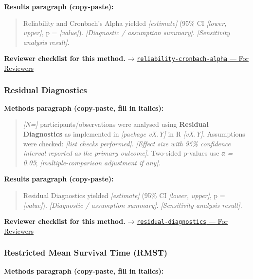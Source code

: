 \documentclass[
]{article}
\begin{document}
\textbf{Results paragraph (copy-paste):}

\begin{quote}
Reliability and Cronbach's Alpha yielded \emph{{[}estimate{]}} (95\% CI
\emph{{[}lower, upper{]}}, p = \emph{{[}value{]}}). \emph{{[}Diagnostic
/ assumption summary{]}}. \emph{{[}Sensitivity analysis result{]}}.
\end{quote}

\textbf{Reviewer checklist for this method.} →
\href{../chapters/14-clinical/reliability-cronbach-alpha.Rmd\#for-reviewers}{\texttt{reliability-cronbach-alpha}
--- For Reviewers}

\subsubsection{Residual Diagnostics}\label{residual-diagnostics}

\textbf{Methods paragraph (copy-paste, fill in italics):}

\begin{quote}
\emph{{[}N={]}} participants/observations were analysed using
\textbf{Residual Diagnostics} as implemented in \emph{{[}package
vX.Y{]}} in R \emph{{[}vX.Y{]}}. Assumptions were checked: \emph{{[}list
checks performed{]}}. \emph{{[}Effect size with 95\% confidence interval
reported as the primary outcome{]}}. Two-sided p-values use \emph{α =
0.05}; \emph{{[}multiple-comparison adjustment if any{]}}.
\end{quote}

\textbf{Results paragraph (copy-paste):}

\begin{quote}
Residual Diagnostics yielded \emph{{[}estimate{]}} (95\% CI
\emph{{[}lower, upper{]}}, p = \emph{{[}value{]}}). \emph{{[}Diagnostic
/ assumption summary{]}}. \emph{{[}Sensitivity analysis result{]}}.
\end{quote}

\textbf{Reviewer checklist for this method.} →
\href{../chapters/07-regression/residual-diagnostics.Rmd\#for-reviewers}{\texttt{residual-diagnostics}
--- For Reviewers}

\subsubsection{Restricted Mean Survival Time
(RMST)}\label{restricted-mean-survival-time-rmst}

\textbf{Methods paragraph (copy-paste, fill in italics):}
\end{document}
